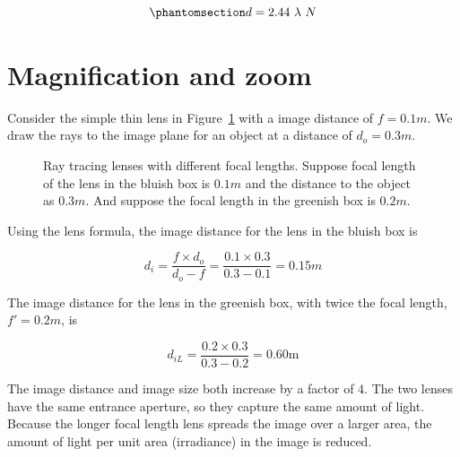 \documentclass[
  letterpaper,
]{book}
\begin{document}
\begin{equation}\phantomsection\label{eq-airy2}{ 
d = 2.44 ~ \lambda ~ N
}\end{equation}

\section{Magnification and zoom}\label{sec-optics-zoom}

Consider the simple thin lens in Figure~\ref{fig-optics-magnification}
with a image distance of \(f = 0.1m\). We draw the rays to the image
plane for an object at a distance of \(d_o = 0.3m\).

\begin{figure}


\caption{\label{fig-optics-magnification}Ray tracing lenses with
different focal lengths. Suppose focal length of the lens in the bluish
box is \(0.1 m\) and the distance to the object as \(0.3m\). And suppose
the focal length in the greenish box is \(0.2 m\).}

\end{figure}%

Using the lens formula, the image distance for the lens in the bluish
box is

\[
d_i = \frac{f \times d_o}{d_o - f} = \frac{0.1 \times 0.3}{0.3 - 0.1} = 0.15 m
\]

The image distance for the lens in the greenish box, with twice the
focal length, \(f' = 0.2m\), is

\[
d_{iL} = \frac{0.2 \times 0.3}{0.3 - 0.2} = 0.60 \text{m}
\]

The image distance and image size both increase by a factor of \(4\).
The two lenses have the same entrance aperture, so they capture the same
amount of light. Because the longer focal length lens spreads the image
over a larger area, the amount of light per unit area (irradiance) in
the image is reduced.
\end{document}
